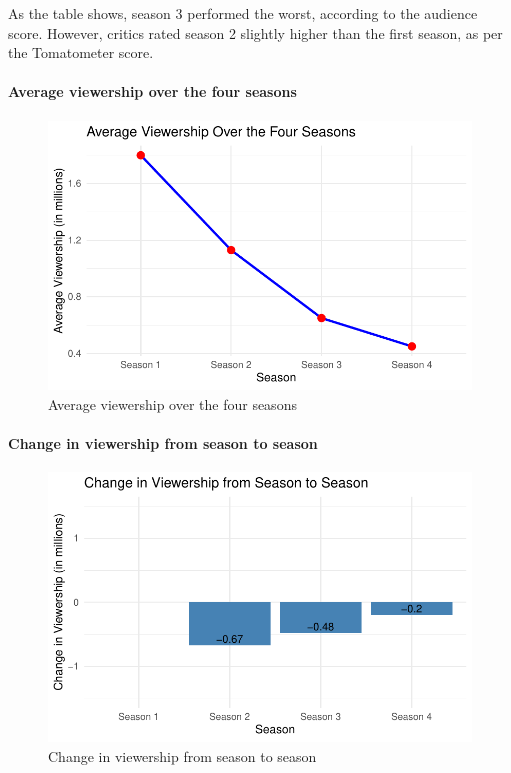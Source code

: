 \documentclass[
  letterpaper,
  DIV=11,
  numbers=noendperiod]{scrartcl}
\let\oldparagraph\paragraph
\renewcommand{\paragraph}[1]{\oldparagraph{#1}\mbox{}}
\begin{document}
As the table shows, season 3 performed the worst, according to the
audience score. However, critics rated season 2 slightly higher than the
first season, as per the Tomatometer score.

\paragraph{Average viewership over the four seasons}

\begin{figure}

{\centering \includegraphics{sinner_files/figure-pdf/unnamed-chunk-2-1.pdf}

}

\caption{Average viewership over the four seasons}

\end{figure}

\paragraph{Change in viewership from season to season}

\begin{figure}

{\centering \includegraphics{sinner_files/figure-pdf/unnamed-chunk-3-1.pdf}

}

\caption{Change in viewership from season to season}

\end{figure}
\end{document}
